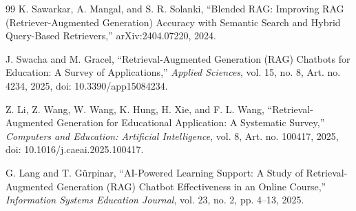 \documentclass[conference]{IEEEtran}
\begin{document}
\begin{thebibliography}{99}
K. Sawarkar, A. Mangal, and S. R. Solanki,
``Blended RAG: Improving RAG
(Retriever-Augmented Generation) Accuracy
with Semantic Search and Hybrid Query-Based
Retrievers,''
arXiv:2404.07220, 2024.

J. Swacha and M. Gracel,
``Retrieval-Augmented Generation (RAG)
Chatbots for Education: A Survey of
Applications,''
\emph{Applied Sciences}, vol. 15, no. 8,
Art. no. 4234, 2025,
doi: 10.3390/app15084234.

Z. Li, Z. Wang, W. Wang, K. Hung,
H. Xie, and F. L. Wang,
``Retrieval-Augmented Generation for
Educational Application: A Systematic Survey,''
\emph{Computers and Education: Artificial
Intelligence}, vol. 8, Art. no. 100417,
2025,
doi: 10.1016/j.caeai.2025.100417.

G. Lang and T. G\"urpinar,
``AI-Powered Learning Support: A Study of
Retrieval-Augmented Generation (RAG)
Chatbot Effectiveness in an Online Course,''
\emph{Information Systems Education Journal},
vol. 23, no. 2, pp. 4--13, 2025.

\end{thebibliography}
\end{document}
